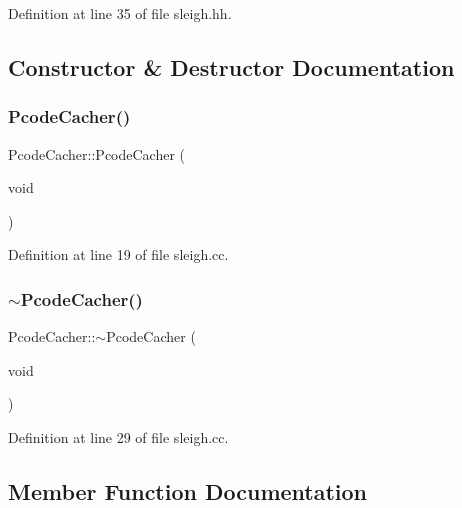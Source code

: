 Definition at line 35 of file sleigh.\+hh.



\subsection{Constructor \& Destructor Documentation}
\mbox{\label{class_pcode_cacher_ab165af5d7b6e70864878b6c481b3c7ee}} 
\subsubsection{\texorpdfstring{PcodeCacher()}{PcodeCacher()}}
{\footnotesize\ttfamily Pcode\+Cacher\+::\+Pcode\+Cacher (\begin{DoxyParamCaption}\item[{void}]{ }\end{DoxyParamCaption})}



Definition at line 19 of file sleigh.\+cc.

\mbox{\label{class_pcode_cacher_a9c5967c5d408d69a7b0cabe9897a7d42}} 
\subsubsection{\texorpdfstring{$\sim$PcodeCacher()}{~PcodeCacher()}}
{\footnotesize\ttfamily Pcode\+Cacher\+::$\sim$\+Pcode\+Cacher (\begin{DoxyParamCaption}\item[{void}]{ }\end{DoxyParamCaption})}



Definition at line 29 of file sleigh.\+cc.



\subsection{Member Function Documentation}
\mbox{\label{class_pcode_cacher_a0c78362135eeb99f2b1acef6615c3428}} 
